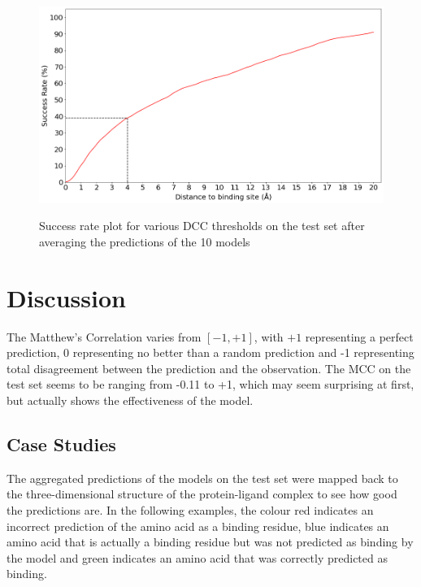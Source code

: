 \documentclass[journal=jacsat,manuscript=article]{achemso}
\begin{document}
\begin{figure}
    \caption{\centering Success rate plot for various DCC thresholds on the test set after averaging the predictions of the 10 models}
    \centering
    \noindent\includegraphics[scale=0.45]{test_dcc.png}
    \label{fig:test_dcc}
\end{figure}









\section{Discussion}
\quad The Matthew's Correlation varies from $[-1, +1]$, with $+1$ representing a perfect prediction, 0 representing no better than a random prediction and -1 representing total disagreement between the prediction and the observation. The MCC on the test set seems to be ranging from -0.11 to +1, which may seem surprising at first, but actually shows the effectiveness of the model.

\subsection{Case Studies}
\quad The aggregated predictions of the models on the test set were mapped back to the three-dimensional structure of the protein-ligand complex to see how good the predictions are. In the following examples, the colour red indicates an incorrect prediction of the amino acid as a binding residue, blue indicates an amino acid that is actually a binding residue but was not predicted as binding by the model and green indicates an amino acid that was correctly predicted as binding.
\end{document}
